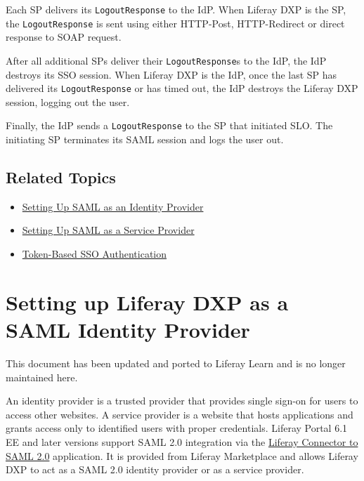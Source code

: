 Each SP delivers its \texttt{LogoutResponse} to the IdP. When Liferay
DXP is the SP, the \texttt{LogoutResponse} is sent using either
HTTP-Post, HTTP-Redirect or direct response to SOAP request.

After all additional SPs deliver their \texttt{LogoutResponse}s to the
IdP, the IdP destroys its SSO session. When Liferay DXP is the IdP, once
the last SP has delivered its \texttt{LogoutResponse} or has timed out,
the IdP destroys the Liferay DXP session, logging out the user.

Finally, the IdP sends a \texttt{LogoutResponse} to the SP that
initiated SLO. The initiating SP terminates its SAML session and logs
the user out.

\section{Related Topics}\label{related-topics-6}

\begin{itemize}
\tightlist
\item
  \href{/docs/7-2/deploy/-/knowledge_base/d/setting-up-liferay-as-a-saml-identity-provider}{Setting
  Up SAML as an Identity Provider}
\item
  \href{/docs/7-2/deploy/-/knowledge_base/d/setting-up-liferay-as-a-saml-service-provider}{Setting
  Up SAML as a Service Provider}
\item
  \href{/docs/7-2/deploy/-/knowledge_base/d/token-based-single-sign-on-authentication}{Token-Based
  SSO Authentication}
\end{itemize}

\chapter{Setting up Liferay DXP as a SAML Identity
Provider}\label{setting-up-liferay-dxp-as-a-saml-identity-provider}

{This document has been updated and ported to Liferay Learn and is no
longer maintained here.}

An identity provider is a trusted provider that provides single sign-on
for users to access other websites. A service provider is a website that
hosts applications and grants access only to identified users with
proper credentials. Liferay Portal 6.1 EE and later versions support
SAML 2.0 integration via the
\href{https://web.liferay.com/marketplace/-/mp/application/15188711}{Liferay
Connector to SAML 2.0} application. It is provided from Liferay
Marketplace and allows Liferay DXP to act as a SAML 2.0 identity
provider or as a service provider.


